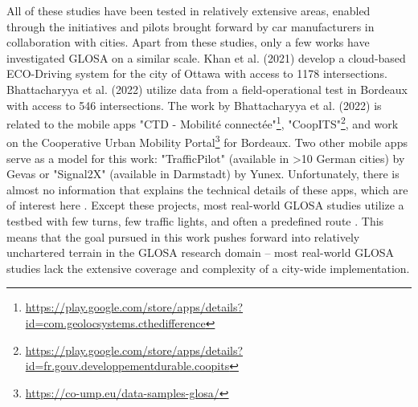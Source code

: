 All of these studies have been tested in relatively extensive areas, enabled through the initiatives and pilots brought forward by car manufacturers in collaboration with cities. Apart from these studies, only a few works have investigated GLOSA on a similar scale. Khan et al. (2021) \cite{khan_eco-drive_2021} develop a cloud-based ECO-Driving system for the city of Ottawa with access to 1178 intersections. Bhattacharyya et al. (2022) \cite{bhattacharyya_assessing_2022} utilize data from a field-operational test in Bordeaux with access to 546 intersections. The work by Bhattacharyya et al. (2022) \cite{bhattacharyya_assessing_2022} is related to the mobile apps "CTD - Mobilité connectée"\footnote{\url{https://play.google.com/store/apps/details?id=com.geolocsystems.cthedifference}}, "CoopITS"\footnote{\url{https://play.google.com/store/apps/details?id=fr.gouv.developpementdurable.coopits}}, and work on the Cooperative Urban Mobility Portal\footnote{\url{https://co-ump.eu/data-samples-glosa/}} for Bordeaux. Two other mobile apps serve as a model for this work: "TrafficPilot" (available in >10 German cities) by Gevas or "Signal2X" (available in Darmstadt) by Yunex. Unfortunately, there is almost no information that explains the technical details of these apps, which are of interest here \cite{yunex_traffic_v2x-kommunikation_2023}. Except these projects, most real-world GLOSA studies utilize a testbed with few turns, few traffic lights, and often a predefined route \cite{iglesias_i2v_2008, schweiger_elisatm_2011, raubitschek_predictive_2011, koukoumidis_signalguru_2011, koukoumidis_leveraging_2012, hao_eco-approach_2019, fickas_fast_2019, chen_developing_2022}. This means that the goal pursued in this work pushes forward into relatively unchartered terrain in the GLOSA research domain -- most real-world GLOSA studies lack the extensive coverage and complexity of a city-wide implementation.

